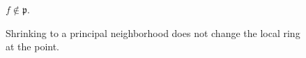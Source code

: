 \begin{figure}[htbp]
\centering
{}
\qquad $f\notin\mathfrak p$.
\caption{Shrinking to a principal neighborhood does not change the local ring at the point.}
\end{figure}
